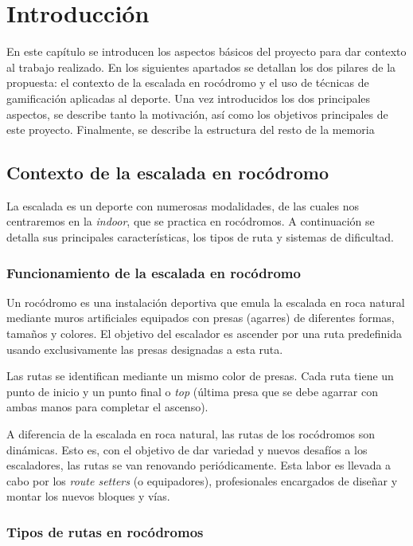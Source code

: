 \chapter{Introducción}
\label{cap:introduccion}

En este capítulo se introducen los aspectos básicos del proyecto para dar contexto al trabajo realizado. En los siguientes apartados se detallan los dos pilares de la propuesta: el contexto de la escalada en rocódromo y el uso de técnicas de gamificación aplicadas al deporte. Una vez introducidos los dos principales aspectos, se describe tanto la motivación, así como los objetivos principales de este proyecto. Finalmente, se describe la estructura del resto de la memoria

\section{Contexto de la escalada en rocódromo}

La escalada es un deporte con numerosas modalidades, de las cuales nos centraremos en la \textit{indoor}, que se practica en rocódromos. A continuación se detalla sus principales características, los tipos de ruta y sistemas de dificultad.

\subsection{Funcionamiento de la escalada en rocódromo}

Un rocódromo es una instalación deportiva que emula la escalada en roca natural mediante muros artificiales equipados con presas (agarres) de diferentes formas, tamaños y colores. El objetivo del escalador es ascender por una ruta predefinida usando exclusivamente las presas designadas a esta ruta.

Las rutas se identifican mediante un mismo color de presas. Cada ruta tiene un punto de inicio y un punto final o \textit{top} (última presa que se debe agarrar con ambas manos para completar el ascenso).

A diferencia de la escalada en roca natural, las rutas de los rocódromos son dinámicas. Esto es, con el objetivo de dar variedad y nuevos desafíos a los escaladores, las rutas se van renovando periódicamente. Esta labor es llevada a cabo por los \textit{route setters} (o equipadores), profesionales encargados de diseñar y montar los nuevos bloques y vías.

\subsection{Tipos de rutas en rocódromos}


